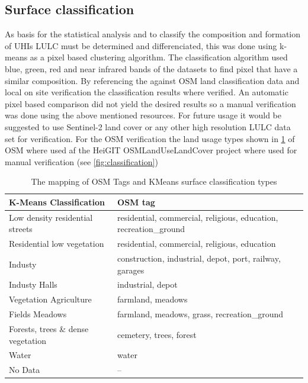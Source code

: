 \documentclass[a4paper, english]{article}
\begin{document}
\subsection{Surface classification}
As basis for the statistical analysis and to classify the composition and formation of \acp{UHI} \ac{LULC} must be determined and differenciated, this was done using k-means as a pixel based clustering algorithm. 
The classification algorithm used blue, green, red and near infrared bands of the datasets to find pixel that have a similar composition.
By referencing the against \ac{OSM} land classification data%
and local on site verification the classification results where verified.
An automatic pixel based comparison did not yield the desired results so a manual verification was done using the above mentioned resources. 
For future usage it would be suggested to use Sentinel-2  land cover or any other high resolution \ac{LULC} data set for verification.
For the \ac{OSM} verification the land usage types shown in \cref{tbl:types} of \ac{OSM} where used af the HeiGIT OSMLandUseLandCover project where used for manual verification (see \cref{fig:classification})
\begin{table}[!htbp]
    \centering
    \begin{tabular}{l l}
      \toprule
    \textbf{K-Means Classification} & \textbf{OSM tag} \\ \midrule
    Low density residential streets &  residential, commercial, religious, education, recreation\_ground \\ 
    Residential low vegetation & residential, commercial, religious, education\\ 
    Industy & construction, industrial, depot, port, railway, garages\\ 
    Industy Halls & industrial, depot \\ 
    Vegetation Agriculture & farmland, meadows\\ 
    Fields Meadows & farmland, meadows, grass, recreation\_ground\\ 
    Forests, trees \& dense vegetation & cemetery, trees, forest\\
    Water & water \\
    No Data & -- \\\bottomrule
    \end{tabular}
    \caption{The mapping of OSM Tags and KMeans surface classification types}
    \label{tbl:types}
\end{table}
\end{document}
